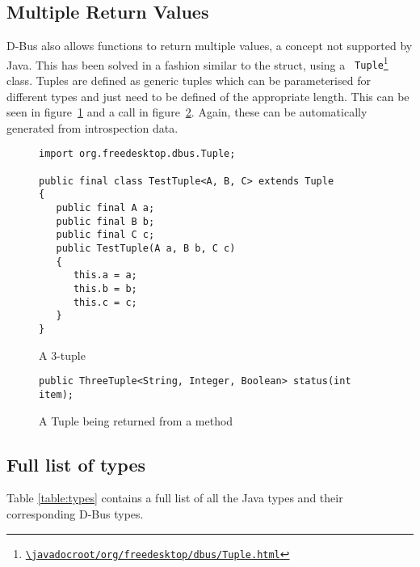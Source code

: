 \documentclass[a4paper,12pt]{article}
\begin{document}
\subsection{Multiple Return Values}

D-Bus also allows functions to return multiple values, a concept not supported
by Java. This has been solved in a fashion similar to the struct, using a {\tt
Tuple\footnote{\url{\javadocroot/org/freedesktop/dbus/Tuple.html}}}
class. Tuples are defined as generic tuples which can be parameterised for
different types and just need to be defined of the appropriate length. This can
be seen in figure~\ref{fig:tuple} and a call in figure~\ref{fig:tuplemethod}.
Again, these can be automatically generated from introspection data.

\begin{figure}[htb]
\begin{center}
\begin{verbatim}
import org.freedesktop.dbus.Tuple;

public final class TestTuple<A, B, C> extends Tuple
{
   public final A a;
   public final B b;
   public final C c;
   public TestTuple(A a, B b, C c)
   {
      this.a = a;
      this.b = b;
      this.c = c;
   }
}
\end{verbatim}
\end{center}
\caption{A 3-tuple}
\label{fig:tuple}
\end{figure}

\begin{figure}[htb]
\begin{center}
\begin{verbatim}
public ThreeTuple<String, Integer, Boolean> status(int item);
\end{verbatim}
\end{center}
\caption{A Tuple being returned from a method}
\label{fig:tuplemethod}
\end{figure}

\subsection{Full list of types}

Table \ref{table:types} contains a full list of all the Java types and their corresponding D-Bus types.
\end{document}

